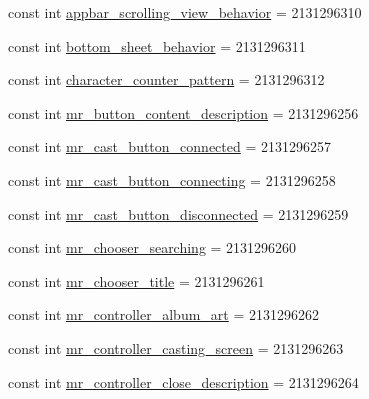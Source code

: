 \begin{DoxyCompactItemize}
\item 
const int \mbox{\hyperlink{class_f_w_p_s___app_1_1_droid_1_1_resource_1_1_string_a305687b5c307c2455ccce757fea7c577}{appbar\+\_\+scrolling\+\_\+view\+\_\+behavior}} = 2131296310
\item 
const int \mbox{\hyperlink{class_f_w_p_s___app_1_1_droid_1_1_resource_1_1_string_a79d87f5505898d57867fe53f087bf176}{bottom\+\_\+sheet\+\_\+behavior}} = 2131296311
\item 
const int \mbox{\hyperlink{class_f_w_p_s___app_1_1_droid_1_1_resource_1_1_string_a957fdb426ea3d30faee90d792b264bc6}{character\+\_\+counter\+\_\+pattern}} = 2131296312
\item 
const int \mbox{\hyperlink{class_f_w_p_s___app_1_1_droid_1_1_resource_1_1_string_a1bedfb67d311fe420adc8ba552da44f9}{mr\+\_\+button\+\_\+content\+\_\+description}} = 2131296256
\item 
const int \mbox{\hyperlink{class_f_w_p_s___app_1_1_droid_1_1_resource_1_1_string_a1329b514ac610020e320c8fc01570eb9}{mr\+\_\+cast\+\_\+button\+\_\+connected}} = 2131296257
\item 
const int \mbox{\hyperlink{class_f_w_p_s___app_1_1_droid_1_1_resource_1_1_string_ab4af35ed3316deda0b4a27d0c86713ff}{mr\+\_\+cast\+\_\+button\+\_\+connecting}} = 2131296258
\item 
const int \mbox{\hyperlink{class_f_w_p_s___app_1_1_droid_1_1_resource_1_1_string_a3cf44f26d4e5eece2b94b8102ffda28f}{mr\+\_\+cast\+\_\+button\+\_\+disconnected}} = 2131296259
\item 
const int \mbox{\hyperlink{class_f_w_p_s___app_1_1_droid_1_1_resource_1_1_string_afda5ec9511c4a478cccd63c3629c0660}{mr\+\_\+chooser\+\_\+searching}} = 2131296260
\item 
const int \mbox{\hyperlink{class_f_w_p_s___app_1_1_droid_1_1_resource_1_1_string_ad910b2ab8ce1f2c3f43642bd7900031d}{mr\+\_\+chooser\+\_\+title}} = 2131296261
\item 
const int \mbox{\hyperlink{class_f_w_p_s___app_1_1_droid_1_1_resource_1_1_string_ac4482e346e2509ed94b7ccf3742ce1e4}{mr\+\_\+controller\+\_\+album\+\_\+art}} = 2131296262
\item 
const int \mbox{\hyperlink{class_f_w_p_s___app_1_1_droid_1_1_resource_1_1_string_a3ad2b2ca35e18d25226741f686aba6e4}{mr\+\_\+controller\+\_\+casting\+\_\+screen}} = 2131296263
\item 
const int \mbox{\hyperlink{class_f_w_p_s___app_1_1_droid_1_1_resource_1_1_string_ada9e5b8c54ebbbfb8cb5b7ff64c05a8b}{mr\+\_\+controller\+\_\+close\+\_\+description}} = 2131296264

\end{DoxyCompactItemize}
